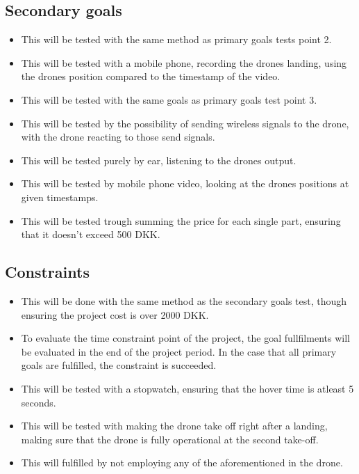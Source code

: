 \documentclass[a4paper,11pt]{article}
\begin{document}
\subsection{Secondary goals}
\begin{itemize}
    \item
          This will be tested with the same method as primary goals tests point 2.
    \item
          This will be tested with a mobile phone, recording the drones landing, using the drones position compared to the timestamp of the video.
    \item
          This will be tested with the same goals as primary goals test point 3.
    \item
          This will be tested by the possibility of sending wireless signals to the drone, with the drone reacting to those send signals.
    \item
          This will be tested purely by ear, listening to the drones output.
    \item
          This will be tested by mobile phone video, looking at the drones positions at given timestamps.
    \item
          This will be tested trough summing the price for each single part, ensuring that it doesn’t exceed 500 DKK.
\end{itemize}

\subsection{Constraints}
\begin{itemize}
    \item
          This will be done with the same method as the secondary goals test, though ensuring the project cost is over 2000 DKK.
    \item
          To evaluate the time constraint point of the project, the goal fullfilments will be evaluated in the end of the project period. In the case that all primary goals are fulfilled, the constraint is succeeded.
    \item
          This will be tested with a stopwatch, ensuring that the hover time is atleast 5 seconds.
    \item
          This will be tested with making the drone take off right after a landing, making sure that the drone is fully operational at the second take-off.
    \item
          This will fulfilled by not employing any of the aforementioned in the drone.
\end{itemize}
\end{document}
